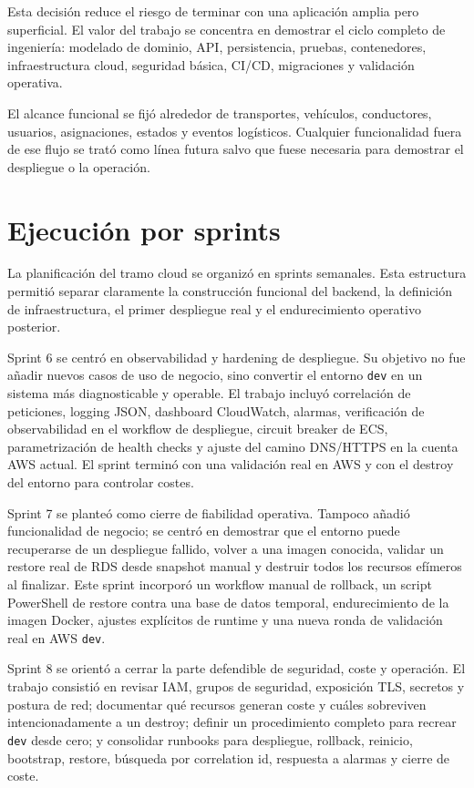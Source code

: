 Esta decisión reduce el riesgo de terminar con una aplicación amplia pero superficial. El valor del trabajo se concentra en demostrar el ciclo completo de ingeniería: modelado de dominio, API, persistencia, pruebas, contenedores, infraestructura cloud, seguridad básica, CI/CD, migraciones y validación operativa.

El alcance funcional se fijó alrededor de transportes, vehículos, conductores, usuarios, asignaciones, estados y eventos logísticos. Cualquier funcionalidad fuera de ese flujo se trató como línea futura salvo que fuese necesaria para demostrar el despliegue o la operación.

\section{Ejecución por sprints}
\label{sec:ejecucion-sprints}

La planificación del tramo cloud se organizó en sprints semanales. Esta estructura permitió separar claramente la construcción funcional del backend, la definición de infraestructura, el primer despliegue real y el endurecimiento operativo posterior.

Sprint 6 se centró en observabilidad y hardening de despliegue. Su objetivo no fue añadir nuevos casos de uso de negocio, sino convertir el entorno \texttt{dev} en un sistema más diagnosticable y operable. El trabajo incluyó correlación de peticiones, logging JSON, dashboard CloudWatch, alarmas, verificación de observabilidad en el workflow de despliegue, circuit breaker de ECS, parametrización de health checks y ajuste del camino DNS/HTTPS en la cuenta AWS actual. El sprint terminó con una validación real en AWS y con el destroy del entorno para controlar costes.

Sprint 7 se planteó como cierre de fiabilidad operativa. Tampoco añadió funcionalidad de negocio; se centró en demostrar que el entorno puede recuperarse de un despliegue fallido, volver a una imagen conocida, validar un restore real de RDS desde snapshot manual y destruir todos los recursos efímeros al finalizar. Este sprint incorporó un workflow manual de rollback, un script PowerShell de restore contra una base de datos temporal, endurecimiento de la imagen Docker, ajustes explícitos de runtime y una nueva ronda de validación real en AWS \texttt{dev}.

Sprint 8 se orientó a cerrar la parte defendible de seguridad, coste y operación. El trabajo consistió en revisar IAM, grupos de seguridad, exposición TLS, secretos y postura de red; documentar qué recursos generan coste y cuáles sobreviven intencionadamente a un destroy; definir un procedimiento completo para recrear \texttt{dev} desde cero; y consolidar runbooks para despliegue, rollback, reinicio, bootstrap, restore, búsqueda por correlation id, respuesta a alarmas y cierre de coste.

